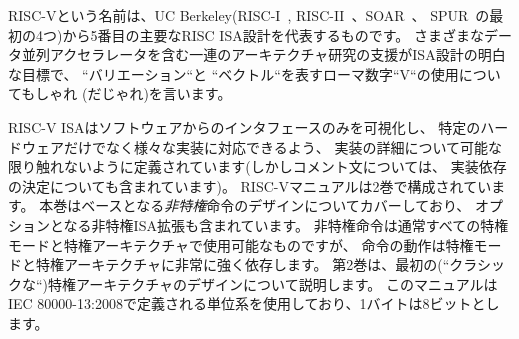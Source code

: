 \begin{comment}
\begin{commentary}
  Commentary on our design decisions is formatted as in this
  paragraph.  This non-normative text can be skipped if the reader is
  only interested in the specification itself.
\end{commentary}

\begin{commentary}
  私たちのデザイン決定に関する論評(解説)は、
  この段落のように書式化されており、
  読者が仕様書そのもののみに興味がある場合スキップすることができます。
\end{commentary}

\begin{comment}
\begin{commentary}
The name RISC-V was chosen to represent the fifth major RISC ISA
design from UC Berkeley (RISC-I~\cite{riscI-isca1981},
RISC-II~\cite{Katevenis:1983}, SOAR~\cite{Ungar:1984}, and
SPUR~\cite{spur-jsscc1989} were the first four).  We also pun on the
use of the Roman numeral ``V'' to signify ``variations'' and
``vectors'', as support for a range of architecture research,
including various data-parallel accelerators, is an explicit goal of
the ISA design.
\end{commentary}
\end{comment}

\begin{commentary}
  RISC-Vという名前は、UC Berkeley(RISC-I~\cite{riscI-isca1981},
    RISC-II~\cite{Katevenis:1983}、SOAR~\cite{Ungar:1984}、
    SPUR~\cite{spur-jsscc1989}の最初の4つ)から5番目の主要なRISC
  ISA設計を代表するものです。
  さまざまなデータ並列アクセラレータを含む一連のアーキテクチャ研究の支援がISA設計の明白な目標で、
  ``バリエーション``と ``ベクトル``を表すローマ数字``V``の使用についてもしゃれ
  (だじゃれ)を言います。
\end{commentary}

RISC-V ISAはソフトウェアからのインタフェースのみを可視化し、
特定のハードウェアだけでなく様々な実装に対応できるよう、
実装の詳細について可能な限り触れないように定義されています(しかしコメント文については、
実装依存の決定についても含まれています)。
RISC-Vマニュアルは2巻で構成されています。
本巻はベースとなる{\em 非特権}命令のデザインについてカバーしており、
オプションとなる非特権ISA拡張も含まれています。
非特権命令は通常すべての特権モードと特権アーキテクチャで使用可能なものですが、
命令の動作は特権モードと特権アーキテクチャに非常に強く依存します。
第2巻は、最初の(``クラシックな``)特権アーキテクチャのデザインについて説明します。
このマニュアルはIEC 80000-13:2008で定義される単位系を使用しており、1バイトは8ビットとします。

